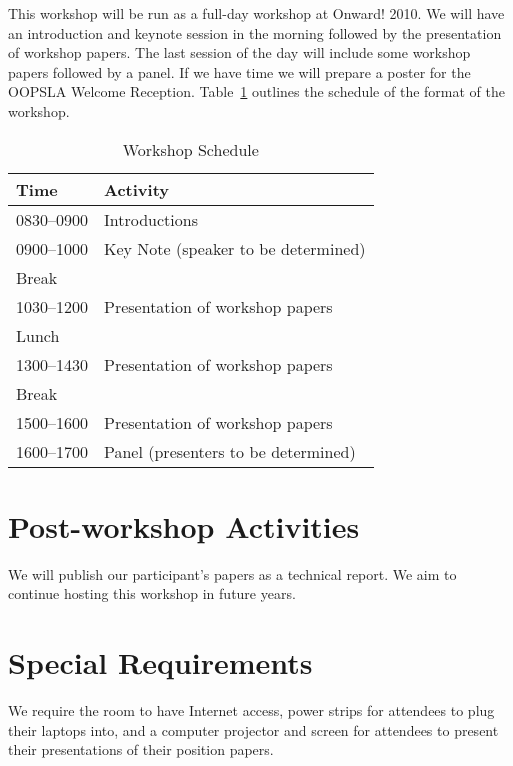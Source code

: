 \documentclass[authorpermission]{sigplanconf}
\begin{document}
This workshop will be run as a full-day workshop at Onward! 2010.  We
will have an introduction and keynote session in the morning followed
by the presentation of workshop papers.  The last session of the day
will include some workshop papers followed by a panel. 
If we have time we will prepare a poster for the
OOPSLA Welcome Reception.  Table~\ref{tab:schedule} outlines the
schedule of the format of the workshop.


\begin{table} [!htbp] %
\begin{tabularx}{\columnwidth}{l|X}
\textbf{Time}   & \textbf{Activity} \\
\hline
0830--0900    & Introductions \vspace{1mm} \\
0900--1000    & Key Note (speaker to be determined) \vspace{1mm} \\
Break              & ~\vspace{1mm}\\
1030--1200   & Presentation of workshop papers \vspace{1mm}\\
Lunch             & ~\vspace{1mm}\\
1300--1430   & Presentation of workshop papers \vspace{1mm}\\
Break              & ~\vspace{1mm}\\
1500--1600    & Presentation of workshop papers \vspace{1mm}\\
1600--1700    & Panel (presenters to be determined) \\

\end{tabularx}
\caption{Workshop Schedule}
\label{tab:schedule}
\end{table}

\section{Post-workshop Activities}

We will publish our participant's papers as a technical report.
We aim to continue hosting this workshop in future years.

\section{Special Requirements}

We require the room to have Internet access, power strips for
attendees to plug their laptops into, and a computer projector and
screen for attendees to present their presentations of their position
papers.
\end{document}
